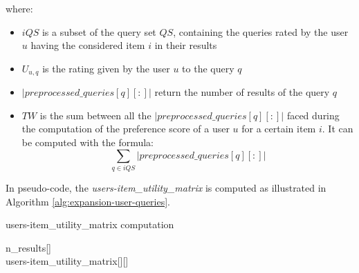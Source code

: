 where:
\begin{itemize}
    \item $iQS$ is a subset of the query set $QS$, containing the queries rated by the user $u$ having the considered item $i$ in their results
    \item ${U}_{u,q}$ is the rating given by the user $u$ to the query $q$
    \item $|preprocessed\_queries[q][:]| $ return the number of results of the query $q$
    \item $TW$ is the sum between all the $|preprocessed\_queries[q][:]| $ faced during the computation of the preference score of a user $u$ for a certain item $i$. It can be computed with the formula: \\
    $${\sum_{q \in iQS}|preprocessed\_queries[q][:]|}$$
\end{itemize}

In pseudo-code, the \textit{users-item\_utility\_matrix} is computed as illustrated in Algorithm \ref{alg:expansion-user-queries}.

\begin{algorithm}
\caption{users-item\_utility\_matrix computation}\label{alg:expansion-user-queries}
n\_results[] \\
users-item\_utility\_matrix[][] \\
\end{algorithm}

